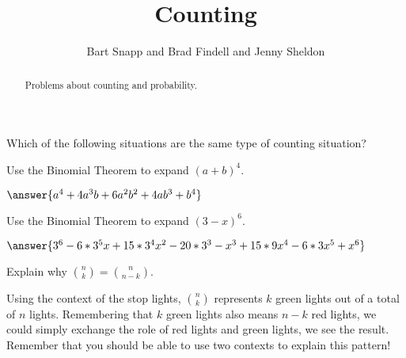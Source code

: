 \documentclass[nooutcomes]{ximera}
\title{Counting}
\author{Bart Snapp and Brad Findell and Jenny Sheldon}
\begin{document}
\begin{abstract}
Problems about counting and probability.
\end{abstract}
\maketitle




\begin{problem}
	Which of the following situations are the same type of counting situation?
	
	\begin{selectAll}
	\end{selectAll}
\end{problem}


\begin{problem}
Use the Binomial Theorem to expand $(a+b)^4$.
\begin{prompt}
 $\answer{a^4+4a^3b+6a^2b^2+4ab^3+b^4}$
\end{prompt}
\end{problem}


\begin{problem}
Use the Binomial Theorem to expand $(3-x)^6$.
\begin{prompt}
 $\answer{3^6-6*3^5x+15*3^4x^2-20*3^3-x^3+15*9x^4-6*3x^5+x^6}$
\end{prompt}
\end{problem}


\begin{problem}
Explain why ${n \choose k} = {n \choose n-k}$.
\begin{freeResponse}
	\begin{hint}
		Using the context of the stop lights, ${n \choose k}$ represents $k$ green lights out of a total of $n$ lights.  Remembering that $k$ green lights also means $n-k$ red lights, we could simply exchange the role of red lights and green lights, we see the result.  Remember that you should be able to use two contexts to explain this pattern!
	\end{hint}
\end{freeResponse}
\end{problem}
\end{document}
